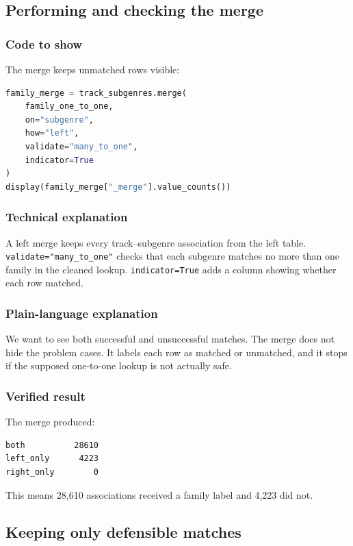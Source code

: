 \documentclass[11pt,a4paper]{article}
\begin{document}
\subsection{Performing and checking the merge}

\subsubsection*{Code to show}
The merge keeps unmatched rows visible:

\begin{lstlisting}[language=Python]
family_merge = track_subgenres.merge(
    family_one_to_one,
    on="subgenre",
    how="left",
    validate="many_to_one",
    indicator=True
)
display(family_merge["_merge"].value_counts())
\end{lstlisting}

\subsubsection*{Technical explanation}
A left merge keeps every track--subgenre association from the left table. \texttt{validate="many\_to\_one"} checks that each subgenre matches no more than one family in the cleaned lookup. \texttt{indicator=True} adds a column showing whether each row matched.

\subsubsection*{Plain-language explanation}
We want to see both successful and unsuccessful matches. The merge does not hide the problem cases. It labels each row as matched or unmatched, and it stops if the supposed one-to-one lookup is not actually safe.

\subsubsection*{Verified result}
The merge produced:

\begin{lstlisting}
both          28610
left_only      4223
right_only        0
\end{lstlisting}

This means 28,610 associations received a family label and 4,223 did not.

\subsection{Keeping only defensible matches}
\end{document}
